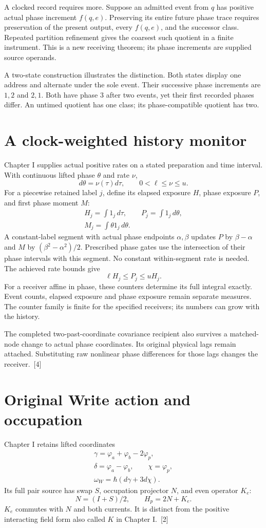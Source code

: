 \documentclass[10pt,twocolumn,letterpaper]{article}
\begin{document}
A clocked record requires more. Suppose an admitted event from $q$ has positive actual phase increment $f(q,e)$. Preserving its entire future phase trace requires preservation of the present output, every $f(q,e)$, and the successor class. Repeated partition refinement gives the coarsest such quotient in a finite instrument. This is a new receiving theorem; its phase increments are supplied source operands.

A two-state construction illustrates the distinction. Both states display one address and alternate under the sole event. Their successive phase increments are $1,2$ and $2,1$. Both have phase $3$ after two events, yet their first recorded phases differ. An untimed quotient has one class; its phase-compatible quotient has two.

\section{A clock-weighted history monitor}
Chapter I supplies actual positive rates on a stated preparation and time interval. With continuous lifted phase $\theta$ and rate $\nu$,
\[
d\theta=\nu(\tau)d\tau,\qquad 0<\ell\leq\nu\leq u.
\]
For a piecewise retained label $j$, define its elapsed exposure $H$, phase exposure $P$, and first phase moment $M$:
\[
\begin{gathered}
H_j=\int 1_j\,d\tau,\qquad P_j=\int 1_j\,d\theta,\\
M_j=\int \theta 1_j\,d\theta.
\end{gathered}
\]
A constant-label segment with actual phase endpoints $\alpha,\beta$ updates $P$ by $\beta-\alpha$ and $M$ by $(\beta^2-\alpha^2)/2$. Prescribed phase gates use the intersection of their phase intervals with this segment. No constant within-segment rate is needed. The achieved rate bounds give
\[
\ell H_j\leq P_j\leq uH_j.
\]
For a receiver affine in phase, these counters determine its full integral exactly. Event counts, elapsed exposure and phase exposure remain separate measures. The counter family is finite for the specified receivers; its numbers can grow with the history.

The completed two-past-coordinate covariance recipient also survives a matched-node change to actual phase coordinates. Its original physical lags remain attached. Substituting raw nonlinear phase differences for those lags changes the receiver.~[4]

\section{Original Write action and occupation}
Chapter I retains lifted coordinates
\[
\begin{gathered}
\gamma=\varphi_a+\varphi_b-2\varphi_p,\\
\delta=\varphi_a-\varphi_b,\qquad \chi=\varphi_p,\\
\omega_W=\hbar(d\gamma+3d\chi).
\end{gathered}
\]
Its full pair source has swap $S$, occupation projector $N$, and even operator $K_e$:
\[
N=(I+S)/2,\qquad H_p=2N+K_e.
\]
$K_e$ commutes with $N$ and both currents. It is distinct from the positive interacting field form also called $K$ in Chapter I.~[2]
\end{document}
